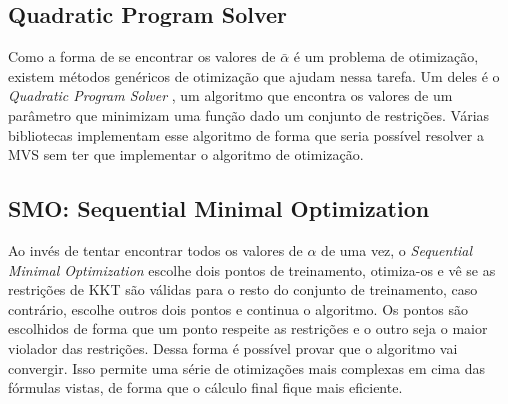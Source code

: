 \subsection{Quadratic Program Solver}\label{sec:quadratic}
Como a forma de se encontrar os valores de $\bar{\alpha}$ é um problema de otimização, existem métodos genéricos de otimização que ajudam nessa tarefa. Um deles é o \emph{Quadratic Program Solver} \cite{osuna1997improved}, um algoritmo que encontra os valores de um parâmetro que minimizam uma função dado um conjunto de restrições. Várias bibliotecas implementam esse algoritmo de forma que seria possível resolver a MVS sem ter que implementar o algoritmo de otimização.

\subsection{SMO: Sequential Minimal Optimization}\label{sec:smo}
Ao invés de tentar encontrar todos os valores de $\alpha$ de uma vez, o \emph{Sequential Minimal Optimization} \cite{platt1998sequential} escolhe dois pontos de treinamento, otimiza-os e vê se as restrições de KKT são válidas para o resto do conjunto de treinamento, caso contrário, escolhe outros dois pontos e continua o algoritmo. Os pontos são escolhidos de forma que um ponto respeite as restrições e o outro seja o maior violador das restrições. Dessa forma é possível provar que o algoritmo vai convergir. Isso permite uma série de otimizações mais complexas em cima das fórmulas vistas, de forma que o cálculo final fique mais eficiente.